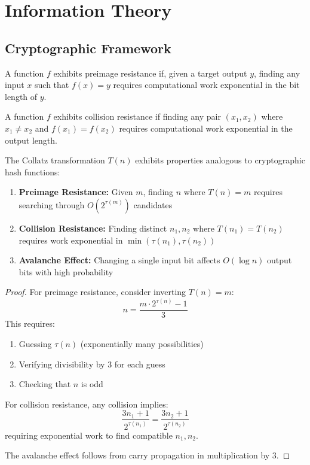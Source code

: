 \section{Information Theory}\label{sec:information_theory}

\subsection{Cryptographic Framework}

\begin{definition}
A function $f$ exhibits preimage resistance if, given a target output $y$, finding any input $x$ such that $f(x) = y$ requires computational work exponential in the bit length of $y$.
\end{definition}

\begin{definition}
A function $f$ exhibits collision resistance if finding any pair $(x_1, x_2)$ where $x_1 \neq x_2$ and $f(x_1) = f(x_2)$ requires computational work exponential in the output length.
\end{definition}

\begin{theorem}
The Collatz transformation $T(n)$ exhibits properties analogous to cryptographic hash functions:
\begin{enumerate}
\item \textbf{Preimage Resistance:} Given $m$, finding $n$ where $T(n) = m$ requires searching through $O(2^{\tau(m)})$ candidates
\item \textbf{Collision Resistance:} Finding distinct $n_1, n_2$ where $T(n_1) = T(n_2)$ requires work exponential in $\min(\tau(n_1), \tau(n_2))$
\item \textbf{Avalanche Effect:} Changing a single input bit affects $O(\log n)$ output bits with high probability
\end{enumerate}
\end{theorem}

\begin{proof}
For preimage resistance, consider inverting $T(n) = m$:
\[
n = \frac{m \cdot 2^{\tau(n)} - 1}{3}
\]
This requires:
\begin{enumerate}
\item Guessing $\tau(n)$ (exponentially many possibilities)
\item Verifying divisibility by 3 for each guess
\item Checking that $n$ is odd
\end{enumerate}

For collision resistance, any collision implies:
\[
\frac{3n_1 + 1}{2^{\tau(n_1)}} = \frac{3n_2 + 1}{2^{\tau(n_2)}}
\]
requiring exponential work to find compatible $n_1, n_2$.

The avalanche effect follows from carry propagation in multiplication by 3.
\end{proof}

